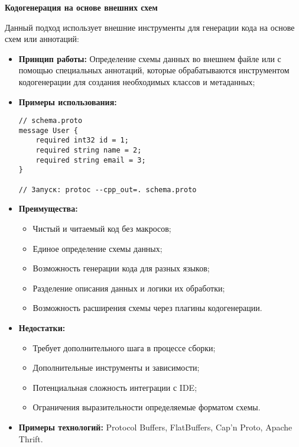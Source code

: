        \textbf{Кодогенерация на основе внешних схем}
        
            Данный подход использует внешние инструменты для генерации кода на основе схем или аннотаций:
            
            \begin{itemize}
                \item \textbf{Принцип работы:} Определение схемы данных во внешнем файле или с помощью специальных аннотаций, которые обрабатываются инструментом кодогенерации для создания необходимых классов и метаданных;
                
                \item \textbf{Примеры использования:} 
                \begin{lstlisting}[style=cpp_style]
// schema.proto
message User {
    required int32 id = 1;
    required string name = 2;
    required string email = 3;
}

// Запуск: protoc --cpp_out=. schema.proto
                \end{lstlisting}
                
                \item \textbf{Преимущества:}
                \begin{itemize}
                    \item Чистый и читаемый код без макросов;
                    \item Единое определение схемы данных;
                    \item Возможность генерации кода для разных языков;
                    \item Разделение описания данных и логики их обработки;
                    \item Возможность расширения схемы через плагины кодогенерации.
                \end{itemize}
                
                \item \textbf{Недостатки:}
                \begin{itemize}
                    \item Требует дополнительного шага в процессе сборки;
                    \item Дополнительные инструменты и зависимости;
                    \item Потенциальная сложность интеграции с IDE;
                    \item Ограничения выразительности определяемые форматом схемы.
                \end{itemize}
                
                \item \textbf{Примеры технологий:} Protocol Buffers, FlatBuffers, Cap'n Proto, Apache Thrift.
            \end{itemize}

